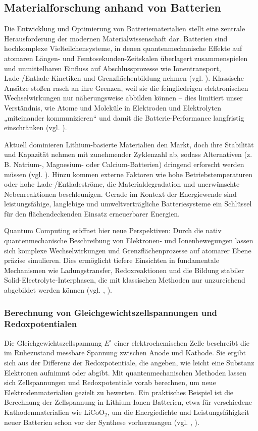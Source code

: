 \subsection{Materialforschung anhand von Batterien}
{Die Entwicklung und Optimierung von Batteriematerialien stellt eine zentrale Herausforderung der modernen Materialwissenschaft dar. Batterien sind hochkomplexe Vielteilchensysteme, in denen quantenmechanische Effekte auf atomaren Längen- und Femtosekunden-Zeitskalen überlagert zusammenspielen und unmittelbaren Einfluss auf Abschlussprozesse wie Ionentransport, Lade-/Entlade-Kinetiken und Grenzflächenbildung nehmen (vgl. \cite{bauer_quantum_2020}). Klassische Ansätze stoßen rasch an ihre Grenzen, weil sie die feingliedrigen elektronischen Wechselwirkungen nur näherungsweise abbilden können – dies limitiert unser Verständnis, wie Atome und Moleküle in Elektroden und Elektrolyten „miteinander kommunizieren“ und damit die Batterie-Performance langfristig einschränken (vgl. \cite{demirApplicationQuantumComputing2024}).

Aktuell dominieren Lithium-basierte Materialien den Markt, doch ihre Stabilität und Kapazität nehmen mit zunehmender Zyklenzahl ab, sodass Alternativen (z. B. Natrium-, Magnesium- oder Calcium-Batterien) dringend erforscht werden müssen (vgl. \cite{demirApplicationQuantumComputing2024}). Hinzu kommen externe Faktoren wie hohe Betriebstemperaturen oder hohe Lade-/Entladeströme, die Materialdegradation und unerwünschte Nebenreaktionen beschleunigen. Gerade im Kontext der Energiewende sind leistungsfähige, langlebige und umweltverträgliche Batteriesysteme ein Schlüssel für den flächendeckenden Einsatz erneuerbarer Energien.

Quantum Computing eröffnet hier neue Perspektiven: Durch die nativ quantenmechanische Beschreibung von Elektronen- und Ionenbewegungen lassen sich komplexe Wechselwirkungen und Grenzflächenprozesse auf atomarer Ebene präzise simulieren. Dies ermöglicht tiefere Einsichten in fundamentale Mechanismen wie Ladungstransfer, Redoxreaktionen und die Bildung stabiler Solid-Electrolyte-Interphasen, die mit klassischen Methoden nur unzureichend abgebildet werden können (vgl. \cite{bauer_quantum_2020}, \cite{demirApplicationQuantumComputing2024}).

\subsubsection{Berechnung von Gleichgewichtszellspannungen und Redoxpotentialen}
Die Gleichgewichtszellspannung $E^\circ$ einer elektrochemischen Zelle beschreibt die im Ruhezustand messbare Spannung zwischen Anode und Kathode. Sie ergibt sich aus der Differenz der Redoxpotentiale, die angeben, wie leicht eine Substanz Elektronen aufnimmt oder abgibt. Mit quantenmechanischen Methoden lassen sich Zellspannungen und Redoxpotentiale vorab berechnen, um neue Elektrodenmaterialien gezielt zu bewerten. Ein praktisches Beispiel ist die Berechnung der Zellspannung in Lithium-Ionen-Batterien, etwa für verschiedene Kathodenmaterialien wie LiCoO$_2$, um die Energiedichte und Leistungsfähigkeit neuer Batterien schon vor der Synthese vorherzusagen (vgl. \cite{urban_computational_2016}, \cite{hanaor_computational_2024}).


}
